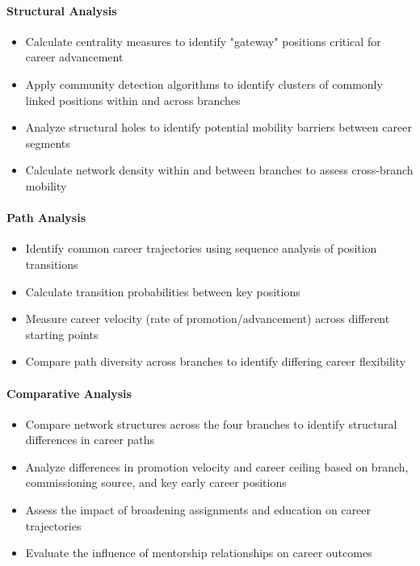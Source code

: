 \documentclass[../main.tex]{subfiles}
\begin{document}
\paragraph{Structural Analysis}
\begin{itemize}
\item Calculate centrality measures to identify "gateway" positions critical for career advancement
\item Apply community detection algorithms to identify clusters of commonly linked positions within and across branches
\item Analyze structural holes to identify potential mobility barriers between career segments
\item Calculate network density within and between branches to assess cross-branch mobility
\end{itemize}

\paragraph{Path Analysis}
\begin{itemize}
\item Identify common career trajectories using sequence analysis of position transitions
\item Calculate transition probabilities between key positions
\item Measure career velocity (rate of promotion/advancement) across different starting points
\item Compare path diversity across branches to identify differing career flexibility
\end{itemize}

\paragraph{Comparative Analysis}
\begin{itemize}
\item Compare network structures across the four branches to identify structural differences in career paths
\item Analyze differences in promotion velocity and career ceiling based on branch, commissioning source, and key early career positions
\item Assess the impact of broadening assignments and education on career trajectories
\item Evaluate the influence of mentorship relationships on career outcomes
\end{itemize}
\end{document}
